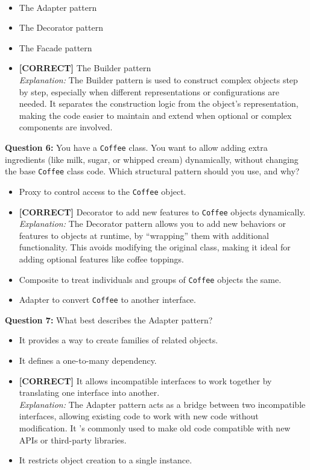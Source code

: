 \\[0.2cm]
\begin{itemize}
 \item The Adapter pattern
 \item The Decorator pattern
 \item The Facade pattern
 \item \textbf{[CORRECT]} The Builder pattern
\\[0.1cm]
\textit{Explanation:} 
The Builder pattern is used to construct complex objects step by step, especially when different representations or configurations are needed. It separates the construction logic from the object's representation, making the code easier to maintain and extend when optional or complex components are involved.
\end{itemize}
\vspace{0.3cm}
\noindent
\textbf{Question 6:} You have a \texttt{Coffee} class. You want to allow adding extra ingredients (like milk, sugar, or whipped cream) dynamically, without changing the base \texttt{Coffee} class code. Which structural pattern should you use, and why?
\\[0.2cm]
\begin{itemize}
 \item Proxy to control access to the \texttt{Coffee} object.
 \item \textbf{[CORRECT]} Decorator to add new features to \texttt{Coffee} objects dynamically.
\\[0.1cm]
\textit{Explanation:} 
The Decorator pattern allows you to add new behaviors or features to objects at runtime, by ``wrapping'' them with additional functionality. This avoids modifying the original class, making it ideal for adding optional features like coffee toppings.
 \item Composite to treat individuals and groups of \texttt{Coffee} objects the same.
 \item Adapter to convert \texttt{Coffee} to another interface.
\end{itemize}
\vspace{0.3cm}
\noindent
\textbf{Question 7:} What best describes the Adapter pattern?
\\[0.2cm]
\begin{itemize}
 \item It provides a way to create families of related objects.
 \item It defines a one-to-many dependency.
 \item \textbf{[CORRECT]} It allows incompatible interfaces to work together by translating one interface into another.
\\[0.1cm]
\textit{Explanation:} 
The Adapter pattern acts as a bridge between two incompatible interfaces, allowing existing code to work with new code without modification. It 's commonly used to make old code compatible with new APIs or third-party libraries.
 \item It restricts object creation to a single instance.
\end{itemize}
